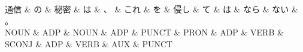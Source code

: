 \documentclass[tikz,border=5pt]{standalone}
\begin{document}
\normalsize
\begin{dependency}[edge unit distance=12.0pt]
    \begin{deptext}[column sep=1em]
        通信 \& の \& 秘密 \& は \& 、 \& これ \& を \& 侵し \& て \& は \& なら \& ない \& 。\\
        NOUN \& ADP \& NOUN \& ADP \& PUNCT \& PRON \& ADP \& VERB \& SCONJ \& ADP \& VERB \& AUX \& PUNCT\\
    \end{deptext}
\end{dependency}
\end{document}
